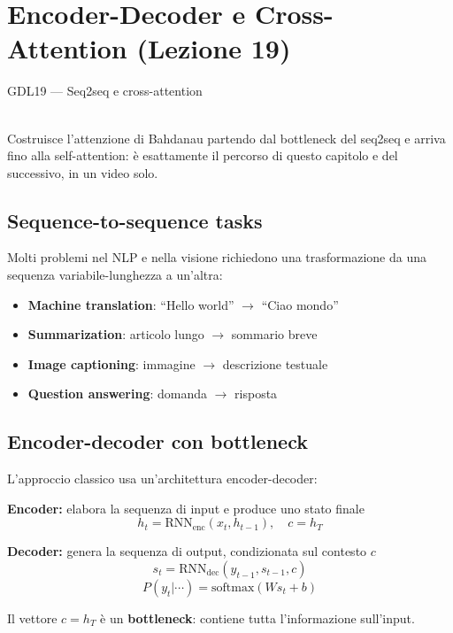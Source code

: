 \chapter{Encoder-Decoder e Cross-Attention (Lezione 19)}

\begin{risorsevideo}{GDL19 — Seq2seq e cross-attention}

\medskip
{}\\
Costruisce l'attenzione di Bahdanau partendo dal bottleneck del seq2seq e arriva fino alla self-attention: è esattamente il percorso di questo capitolo e del successivo, in un video solo.
\end{risorsevideo}

\section{Sequence-to-sequence tasks}

Molti problemi nel NLP e nella visione richiedono una trasformazione da una sequenza variabile-lunghezza a un'altra:

\begin{itemize}
\item \textbf{Machine translation}: ``Hello world'' $\rightarrow$ ``Ciao mondo''
\item \textbf{Summarization}: articolo lungo $\rightarrow$ sommario breve
\item \textbf{Image captioning}: immagine $\rightarrow$ descrizione testuale
\item \textbf{Question answering}: domanda $\rightarrow$ risposta
\end{itemize}

\section{Encoder-decoder con bottleneck}

L'approccio classico usa un'architettura encoder-decoder:

\begin{definition}
\textbf{Encoder:} elabora la sequenza di input e produce uno stato finale
\[
h_t = \text{RNN}_{\text{enc}}(x_t, h_{t-1}), \quad c = h_T
\]

\textbf{Decoder:} genera la sequenza di output, condizionata sul contesto $c$
\[
s_t = \text{RNN}_{\text{dec}}(y_{t-1}, s_{t-1}, c)
\]
\[
P(y_t | \cdots) = \text{softmax}(W s_t + b)
\]

Il vettore $c = h_T$ è un \textbf{bottleneck}: contiene tutta l'informazione sull'input.
\end{definition}

